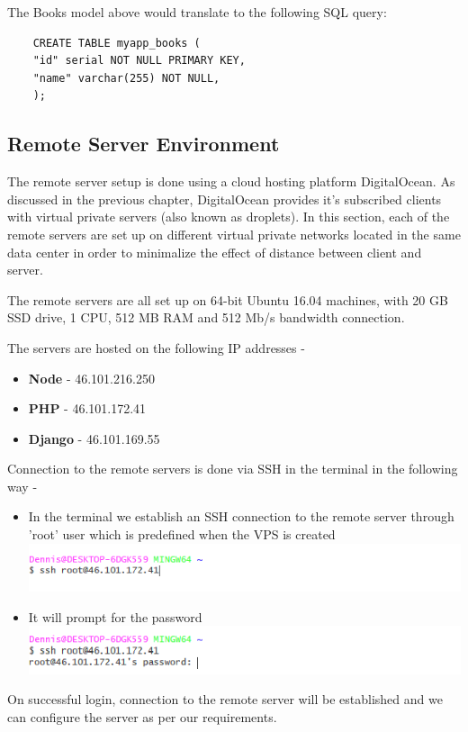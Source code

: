\documentclass[../thesis.tex]{subfiles}
\begin{document}
	The Books model above would translate to the following SQL query:
	\begin{verbatim}
	CREATE TABLE myapp_books (
	"id" serial NOT NULL PRIMARY KEY,
	"name" varchar(255) NOT NULL,
	);
	\end{verbatim}
	\subsection{Remote Server Environment}
	The remote server setup is done using a cloud hosting platform DigitalOcean. As discussed in the previous chapter, DigitalOcean provides it's subscribed clients with virtual private servers (also known as droplets). In this section, each of the remote servers are set up on different virtual private networks located in the same data center in order to minimalize the effect of distance between client and server.
	\newline
	
	The remote servers are all set up on 64-bit Ubuntu 16.04 machines, with 20 GB SSD drive, 1 CPU, 512 MB RAM and 512 Mb/s bandwidth connection.
	\newline
	
	The servers are hosted on the following IP addresses - 	

	\begin{itemize}
		\item \textbf{Node} - 46.101.216.250
		\smallskip
		\item \textbf{PHP} - 46.101.172.41
		\smallskip
		\item \textbf{Django} - 46.101.169.55
	\end{itemize}
	Connection to the remote servers is done via SSH in the terminal in the following way -
	\begin{itemize}
		\item In the terminal we establish an SSH connection to the remote server through 'root' user which is predefined when the VPS is created
		\includegraphics[width=1\textwidth]{../images/ssh1.png}
		\item It will prompt for the password
		\newline
		\includegraphics[width=1\textwidth]{../images/ssh2.png}
	\end{itemize}
	On successful login, connection to the remote server will be established and we can configure the server as per our requirements.
\end{document}
